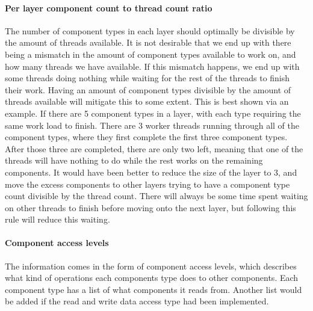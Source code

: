 \paragraph{Per layer component count to thread count ratio}
The number of component types in each layer should optimally be divisible by the amount of threads available.
It is not desirable that we end up with there being a mismatch in the amount of component types available to work on, and how many threads we have available.
If this mismatch happens, we end up with some threads doing nothing while waiting for the rest of the threads to finish their work.
Having an amount of component types divisible by the amount of threads available will mitigate this to some extent.
This is best shown via an example.
If there are 5 component types in a layer, with each type requiring the same work load to finish.
There are 3 worker threads running through all of the component types, where they first complete the first three component types.
After those three are completed, there are only two left, meaning that one of the threads will have nothing to do while the rest works on the remaining components.
It would have been better to reduce the size of the layer to 3, and move the excess components to other layers trying to have a component type count divisible by the thread count.
There will always be some time spent waiting on other threads to finish before moving onto the next layer, but following this rule will reduce this waiting.

\paragraph{Component access levels}
\label{subsec:detailed_component_access_levels}
The information comes in the form of component access levels, which describes what kind of operations each components type does to other components.
Each component type has a list of what components it reads from.
Another list would be added if the read and write data access type had been implemented.

